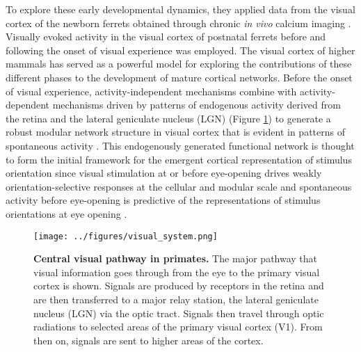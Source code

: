 \documentclass[11pt]{article}
\begin{document}
	
	To explore these early developmental dynamics, they applied data from the visual cortex of the newborn ferrets obtained through chronic \textit{in vivo} calcium imaging \cite{tragenap2023nature}. Visually evoked activity in the visual cortex of postnatal ferrets before and following the onset of visual experience was employed. The visual cortex of higher mammals has served as a powerful model for exploring the contributions of these different phases to the development of mature cortical networks. Before the onset of visual experience, activity-independent mechanisms combine with activity-dependent mechanisms driven by patterns of endogenous activity derived from the retina and the lateral geniculate nucleus (LGN) \cite{feller1996requirement, meister1991synchronous, penn1998competition} (Figure \ref{fig:mamal_visual_cortex}) to generate a robust modular network structure in visual cortex that is evident in patterns of spontaneous activity \cite{chiu2001spontaneous, smith2018distributed}. This endogenously generated functional network is thought to form the initial framework for the emergent cortical representation of stimulus orientation since visual stimulation at or before eye-opening drives weakly orientation-selective responses at the cellular and modular scale \cite{chang2020experience, chapman1996development, crair1998role, godecke1997development, schmidt1999matching} and spontaneous activity before eye-opening is predictive of the representations of stimulus orientations at eye opening \cite{smith2018distributed}. 
	\begin{figure}[H]
		\centering 
		\texttt{[image: ../figures/visual\_system.png]}
		\caption[Central visual system in primates]{\textbf{Central visual pathway in primates.} The major pathway that visual information goes through from the eye to the primary visual cortex is shown. Signals are produced by receptors in the retina and are then transferred to a major relay station, the lateral geniculate nucleus (LGN) via the optic tract. Signals then travel through optic radiations to selected areas of the primary visual cortex (V1). From then on, signals are sent to higher areas of the cortex. \cite{oh2004learning, kardarcortical, montgomery1997seeing}}
		\label{fig:mamal_visual_cortex}
	\end{figure}
	
\end{document}
